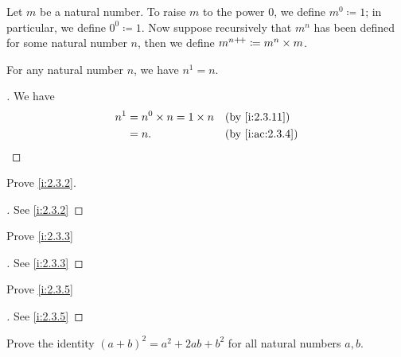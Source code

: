 \begin{defn}\label{i:2.3.11}
  Let \(m\) be a natural number.
  To raise \(m\) to the power \(0\), we define \(m^0 \coloneqq 1\); in particular, we define \(0^0 \coloneqq 1\).
  Now suppose recursively that \(m^n\) has been defined for some natural number \(n\), then we define \(m^{n{+}\!{+}} \coloneqq m^n \times m\).
\end{defn}

\begin{ac}\label{i:ac:2.3.5}
  For any natural number \(n\), we have \(n^1 = n\).
\end{ac}

\begin{proof}[]
  We have
  \begin{align*}
    n^1 & = n^0 \times n = 1 \times n &  & \by{i:2.3.11}   \\
        & = n.                        &  & \by{i:ac:2.3.4}
  \end{align*}
\end{proof}

\exercisesection

\begin{ex}\label{i:ex:2.3.1}
  Prove \cref{i:2.3.2}.
\end{ex}

\begin{proof}[]
  See \cref{i:2.3.2}
\end{proof}

\begin{ex}\label{i:ex:2.3.2}
  Prove \cref{i:2.3.3}
\end{ex}

\begin{proof}[]
  See \cref{i:2.3.3}
\end{proof}

\begin{ex}\label{i:ex:2.3.3}
  Prove \cref{i:2.3.5}
\end{ex}

\begin{proof}[]
  See \cref{i:2.3.5}
\end{proof}

\begin{ex}\label{i:ex:2.3.4}
  Prove the identity \((a + b)^2 = a^2 + 2ab + b^2\) for all natural numbers \(a, b\).
\end{ex}

